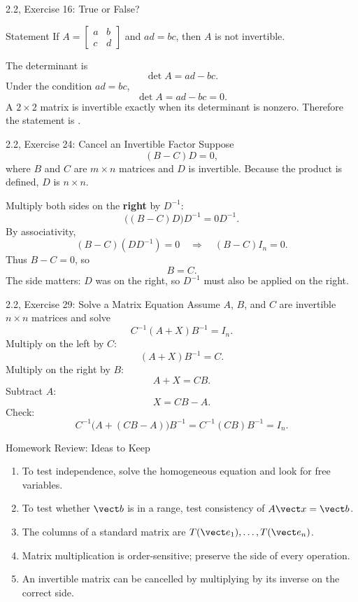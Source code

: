 \begin{frame}{2.2, Exercise 16: True or False?}
\begin{block}{Statement}
If $A=\begin{bmatrix}a&b\\c&d\end{bmatrix}$ and $ad=bc$, then $A$ is not invertible.
\end{block}
\pause
The determinant is
\[
\det A=ad-bc.
\]
Under the condition $ad=bc$,
\[
\det A=ad-bc=0.
\]
\pause
A $2\times2$ matrix is invertible exactly when its determinant is nonzero.
Therefore the statement is .
\end{frame}

\begin{frame}{2.2, Exercise 24: Cancel an Invertible Factor}
Suppose
\[
(B-C)D=0,
\]
where $B$ and $C$ are $m\times n$ matrices and $D$ is invertible.
Because the product is defined, $D$ is $n\times n$.
\pause

Multiply both sides on the \textbf{right} by $D^{-1}$:
\[
\bigl((B-C)D\bigr)D^{-1}=0D^{-1}.
\]
By associativity,
\[
(B-C)(DD^{-1})=0
\quad\Longrightarrow\quad
(B-C)I_n=0.
\]
Thus $B-C=0$, so
\[
\boxed{B=C}.
\]
The side matters: $D$ was on the right, so $D^{-1}$ must also be applied on the right.
\end{frame}

\begin{frame}{2.2, Exercise 29: Solve a Matrix Equation}
Assume $A$, $B$, and $C$ are invertible $n\times n$ matrices and solve
\[
C^{-1}(A+X)B^{-1}=I_n.
\]
\pause
Multiply on the left by $C$:
\[
(A+X)B^{-1}=C.
\]
Multiply on the right by $B$:
\[
A+X=CB.
\]
Subtract $A$:
\[
\boxed{X=CB-A}.
\]
\pause
Check:
\[
C^{-1}\bigl(A+(CB-A)\bigr)B^{-1}
=C^{-1}(CB)B^{-1}=I_n.
\]
\end{frame}

\begin{frame}{Homework Review: Ideas to Keep}
\begin{enumerate}
  \item To test independence, solve the homogeneous equation and look for free variables.
  \item To test whether $\vect b$ is in a range, test consistency of $A\vect x=\vect b$.
  \item The columns of a standard matrix are $T(\vect e_1),\ldots,T(\vect e_n)$.
  \item Matrix multiplication is order-sensitive; preserve the side of every operation.
  \item An invertible matrix can be cancelled by multiplying by its inverse on the correct side.
\end{enumerate}
\end{frame}
